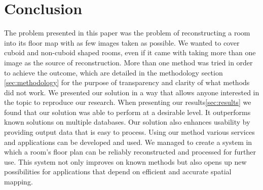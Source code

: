 \section{Conclusion}
The problem presented in this paper was the problem of reconstructing a room into its floor map with as few images taken as possible. We wanted to cover cuboid and non-cuboid shaped rooms, even if it came with taking more than one image as the source of reconstruction. More than one method was tried in order to achieve the outcome, which are detailed in the methodology section \ref{sec:methodology} for the purpose of transparency and clarity of what methods did not work. We presented our solution in a way that allows anyone interested in the topic to reproduce our research. When presenting our results\ref{sec:results} we found that our solution was able to perform at a desirable level. It outperforms known solutions on multiple databases. Our solution also enhances usability by providing output data that is easy to process. Using our method various services and applications can be developed and used. We managed to create a system in which a room's floor plan can be reliably reconstructed and processed for further use. This system not only improves on known methods but also opens up new possibilities for applications that depend on efficient and accurate spatial mapping.